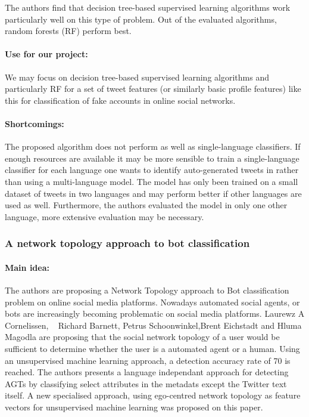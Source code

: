 The authors find that decision tree-based supervised learning algorithms work particularly well on this type of problem. Out of the evaluated algorithms, random forests (RF) perform best.

\paragraph{Use for our project:}
We may focus on decision tree-based supervised learning algorithms and particularly RF for a set of tweet features (or similarly basic profile features) like this for classification of fake accounts in online social networks.

\paragraph{Shortcomings:}
The proposed algorithm does not perform as well as single-language classifiers. If enough resources are available it may be more sensible to train a single-language classifier for each language one wants to identify auto-generated tweets in rather than using a multi-language model. The model has only been trained on a small dataset of tweets in two languages and may perform better if other languages are used as well. Furthermore, the authors evaluated the model in only one other language, more extensive evaluation may be necessary.


\subsubsection{A network topology approach to bot classification}

\paragraph{Main idea:}
The authors are proposing a Network Topology approach to Bot classification problem on online social media platforms. Nowadays automated social agents, or bots are increasingly becoming problematic on social media platforms. Laurewz A Cornelissen, ~\cite{cornelissen2018network} Richard Barnett, Petrus Schoonwinkel,Brent Eichstadt and Hluma Magodla are proposing that the social network topology of a user would be sufficient to determine whether the user is a automated agent or a human. Using an unsupervised machine learning approach, a detection accuracy rate of 70\text{\%} is reached.
The authors presents a language independant approach for detecting AGTs by classifying select attributes in the metadats except the Twitter text itself. A new specialised approach, using ego-centred network topology as feature vectors for unsupervised machine learning was proposed on this paper. 
\cite{cornelissen2018network}

